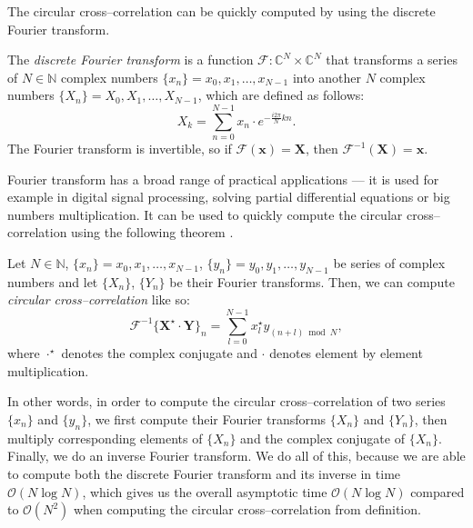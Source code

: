 
The circular cross--correlation can be quickly computed by using the discrete Fourier transform.

The \emph{discrete Fourier transform} is a function $\mathcal{F}: \mathbb{C}^N \times \mathbb{C}^N$ that transforms a series of $N \in \mathbb{N}$ complex numbers $\{x_n\} = x_0, x_1, \dots , x_{N-1}$ into another $N$ complex numbers $\{X_n\} = X_0, X_1, \dots , X_{N-1}$, which are defined as follows:
\[
X_k = \sum_{n=0}^{N-1} x_n \cdot e^{-\frac{i2\pi}{N}kn}.
\]
The Fourier transform is invertible, so if $\mathcal{F}(\mathbf{x}) = \mathbf{X}$, then $\mathcal{F}^{-1}(\mathbf{X}) = \mathbf{x}$.

Fourier transform has a broad range of practical applications --- it is used for example in digital signal processing, solving partial differential equations or big numbers multiplication. It can be used to quickly compute the circular cross--correlation using the following theorem \cite{proakis2004digital}.

Let $N \in \mathbb{N}$, $\{x_n\} = x_0, x_1, \dots , x_{N-1}$, $\{y_n\} = y_0, y_1, \dots , y_{N-1}$ be series of complex numbers and let $\{X_n\}$, $\{Y_n\}$ be their Fourier transforms. Then, we can compute \emph{circular cross--correlation} like so: 
\[
\mathcal{F}^{-1}\{\mathbf{X}^\star \cdot \mathbf{Y}\}_n = \sum_{l=0}^{N-1}x^\star_ly_{(n+l)\bmod N},
\]
where $\cdot^\star$ denotes the complex conjugate and $\cdot$ denotes element by element multiplication.

In other words, in order to compute the circular cross--correlation of two series $\{x_n\}$ and $\{y_n\}$, we first compute their Fourier transforms $\{X_n\}$ and $\{Y_n\}$, then multiply corresponding elements of $\{X_n\}$ and the complex conjugate of $\{X_n\}$. Finally, we do an inverse Fourier transform. We do all of this, because we are able to compute both the discrete Fourier transform and its inverse in time $\mathcal{O}(N \log N)$, which gives us the overall asymptotic time $\mathcal{O}(N \log N)$ compared to $\mathcal{O}(N^2)$ when computing the circular cross--correlation from definition.


